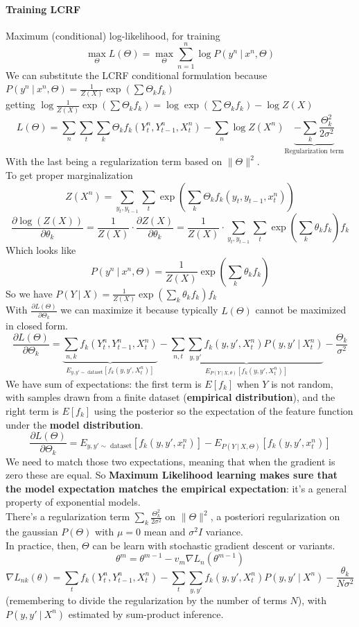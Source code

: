 \documentclass[10pt]{report}
\begin{document}
\paragraph{Training LCRF}Maximum (conditional) log-likelihood, for training $$\max_\Theta L(\Theta) = \max_\Theta\sum_{n=1}^n\log P(y^n\:|\:x^n,\Theta)$$
We can substitute the LCRF conditional formulation because $P(y^n\:|\:x^n,\Theta) = \frac{1}{Z(X)}\exp(\sum \Theta_k f_k)$\\
getting $\log \frac{1}{Z(X)}\exp(\sum \Theta_k f_k) = \log \exp(\sum \Theta_k f_k)-\log Z(X)$
$$L(\Theta)=\sum_n\sum_t\sum_k \Theta_kf_k(Y_t^n,Y_{t-1}^n,X_t^n)-\sum_n\log Z(X^n)\underset{\text{Regularization term}}{\underbrace{-\sum_k\frac{\Theta_k^2}{2\sigma^2}}}$$
With the last being a regularization term based on $\|\Theta\|^2$.\\
To get proper marginalization $$Z(X^n) = \sum_{y_t,y_{t-1}}\sum_t \exp(\sum_k\Theta_k f_k(y_t,y_{t-1},x^n_t))$$
$$\frac{\partial\log(Z(X))}{\partial \theta_k} = \frac{1}{Z(X)}\cdot\frac{\partial Z(X)}{\partial \theta_k} = \frac{1}{Z(X)}\cdot\sum_{y_t,y_{t-1}}\sum_t\exp\left(\sum_k\theta_k f_k\right)f_k$$
Which looks like
$$P(y^n\:|\:x^n,\Theta) = \frac{1}{Z(X)}\exp\left(\sum_k\theta_kf_k\right)$$
So we have $P(Y\:|\:X) = \frac{1}{Z(X)}\exp\left(\sum_k\theta_k f_k\right)f_k$\\
With $\frac{\partial L(\Theta)}{\partial \Theta_k}$ we can maximize it because typically $L(\Theta)$ cannot be maximized in closed form.
$$\frac{\partial L(\Theta)}{\partial \Theta_k} = \underset{E_{y,y'\sim\text{ dataset}}[f_k(y,y',X_t^n)]}{\underbrace{\sum_{n,k}f_k(Y_t^n,Y_{t-1}^n,X_t^n)}}-\underset{E_{P(Y\:|\:X,\theta)}[f_k(y,y',X_t^n)]}{\underbrace{\sum_{n,t}\sum_{y,y'}f_k(y,y',X_t^n)P(y,y'\:|\:X^n_t)}}-\frac{\Theta_k}{\sigma^2}$$ 
We have sum of expectations: the first term is $E[f_k]$ when $Y$ is not random, with samples drawn from a finite dataset (\textbf{empirical distribution}), and the right term is $E[f_k]$ using the posterior so the expectation of the feature function under the \textbf{model distribution}. $$\frac{\partial L(\Theta)}{\partial \Theta_k} = E_{y,y'\sim\text{ dataset}}[f_k(y,y',x^n_t)] - E_{P(Y\:|\:X,\Theta)}[f_k(y,y',x_t^n)]$$
We need to match those two expectations, meaning that when the gradient is zero these are equal. So \textbf{Maximum Likelihood learning makes sure that the model expectation matches the empirical expectation}: it's a general property of exponential models.\\
There's a regularization term $\sum_k\frac{\Theta_k^2}{2\sigma^2}$ on $\|\Theta\|^2$, a posteriori regularization on the gaussian $P(\Theta)$ with $\mu=0$ mean and $\sigma^2I$ variance.\\
In practice, then, $\Theta$ can be learn with stochastic gradient descent or variants.
$$\theta^m = \theta^{m-1} - v_m\nabla L_n(\theta^{m-1})$$
$$\nabla L_{nk}(\theta) = \sum_t f_k(Y_t^n,Y_{t-1}^n,X_t^n)-\sum_t\sum_{y,y'}f_k(y,y',X_t^n)P(y,y'\:|\:X^n)-\frac{\theta_k}{N\sigma^2}$$
(remembering to divide the regularization by the number of terms $N$), with$P(y,y'\:|\:X^n)$ estimated by sum-product inference.
\end{document}
